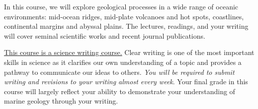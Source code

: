 
In this course, we will explore geological processes in a wide range of oceanic environments: mid-ocean ridges, mid-plate volcanoes and hot spots, coastlines, continental margins and abyssal plains. The lectures, readings, and your writing will cover seminal scientific works and recent journal publications.

\underline{This course is a science writing course.} Clear writing is one of the most important skills in science as it clarifies our own understanding of a topic and provides a pathway to communicate our ideas to others. \emph{You will be required to submit writing and revisions to your writing almost every week}. Your final grade in this course will largely reflect your ability to demonstrate your understanding of marine geology through your writing.
